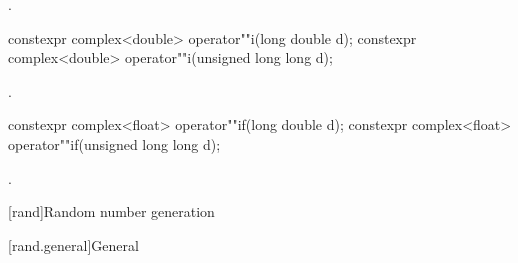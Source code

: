 \begin{itemdescr}
\pnum
\returns
{}.
\end{itemdescr}

%
\begin{itemdecl}
constexpr complex<double> operator""i(long double d);
constexpr complex<double> operator""i(unsigned long long d);
\end{itemdecl}

\begin{itemdescr}
\pnum
\returns
{}.
\end{itemdescr}

%
\begin{itemdecl}
constexpr complex<float> operator""if(long double d);
constexpr complex<float> operator""if(unsigned long long d);
\end{itemdecl}

\begin{itemdescr}
\pnum
\returns
{}.
\end{itemdescr}



[rand]{Random number generation}

[rand.general]{General}

%
%
%
%

